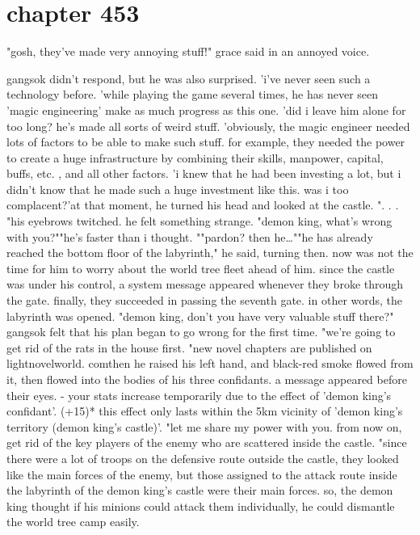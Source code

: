 \section{chapter 453}

"gosh, they've made very annoying stuff!" grace said in an annoyed voice.
 




gangsok didn't respond, but he was also surprised.
'i've never seen such a technology before.
'while playing the game several times, he has never seen 'magic engineering' make as much progress as this one.
'did i leave him alone for too long? he's made all sorts of weird stuff.
'obviously, the magic engineer needed lots of factors to be able to make such stuff.
for example, they needed the power to create a huge infrastructure by combining their skills, manpower, capital, buffs, etc.
, and all other factors.
'i knew that he had been investing a lot, but i didn't know that he made such a huge investment like this.
 was i too complacent?'at that moment, he turned his head and looked at the castle.
 ".
.
.
"his eyebrows twitched.
 he felt something strange.
"demon king, what's wrong with you?""he's faster than i thought.
""pardon? then he…""he has already reached the bottom floor of the labyrinth," he said, turning then.
now was not the time for him to worry about the world tree fleet ahead of him.
since the castle was under his control, a system message appeared whenever they broke through the gate.
 finally, they succeeded in passing the seventh gate.
 in other words, the labyrinth was opened.
"demon king, don't you have very valuable stuff there?"
gangsok felt that his plan began to go wrong for the first time.
"we're going to get rid of the rats in the house first.
"new novel chapters are published on lightnovelworld.
comthen he raised his left hand, and black-red smoke flowed from it, then flowed into the bodies of his three confidants.
 a message appeared before their eyes.
- your stats increase temporarily due to the effect of 'demon king's confidant'.
 (+15)* this effect only lasts within the 5km vicinity of 'demon king's territory (demon king's castle)'.
"let me share my power with you.
 from now on, get rid of the key players of the enemy who are scattered inside the castle.
"since there were a lot of troops on the defensive route outside the castle, they looked like the main forces of the enemy, but those assigned to the attack route inside the labyrinth of the demon king's castle were their main forces.
so, the demon king thought if his minions could attack them individually, he could dismantle the world tree camp easily.
